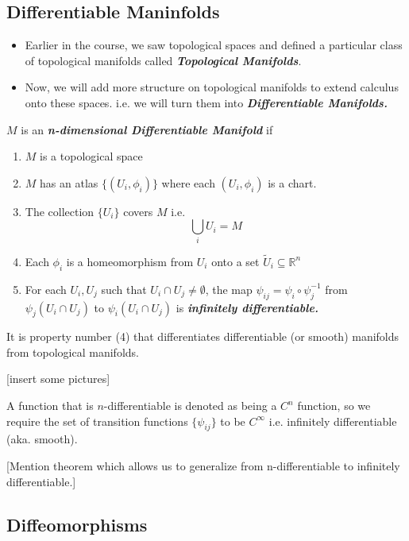 \documentclass{article}
\newcommand{\R}{\mathbb{R}}
\begin{document}
\subsection{Differentiable Maninfolds}

\begin{itemize}
  \item Earlier in the course, we saw topological spaces and defined a particular class of topological manifolds called \emph{\textbf{Topological Manifolds}}.
  \item Now, we will add more structure on topological manifolds to extend calculus onto these spaces. i.e. we will turn them into \emph{\textbf{Differentiable Manifolds.}}
\end{itemize}

\vskip 0.5cm
\begin{mathdefinitionbox}{}
  $M$ is an \emph{\textbf{n-dimensional Differentiable Manifold}} if 
  \begin{enumerate}
    \item $M$ is a topological space
    \item $M$ has an atlas $\{(U_i,\phi_i)\}$ where each $(U_i, \phi_i)$ is a chart.
    \item The collection $\{U_i\}$ covers $M$ i.e. 
    \[ \bigcup_{i} U_i = M \]
    \item Each $\phi_i$ is a homeomorphism from $U_i$ onto a set $\tilde{U}_i \subseteq \R^n$
    \item For each $U_i, U_j$ such that $U_i \cap U_j \neq \emptyset$, the map $\psi_{ij} = \psi_i \circ \psi_{j}^{-1}$ from $\psi_j(U_i \cap U_j)$ to $\psi_i(U_i \cap U_j)$ is \emph{\textbf{infinitely differentiable.}}
  \end{enumerate}
\end{mathdefinitionbox}

\vskip 0.25cm
It is property number (4) that differentiates differentiable (or smooth) manifolds from topological manifolds.

\vskip 0.25cm
[insert some pictures]

\vskip 0.25cm
A function that is $n$-differentiable is denoted as being a $C^{n}$ function, so we require the set of transition functions $\{\psi_{ij}\}$ to be $C^{\infty}$ i.e. infinitely differentiable (aka. smooth).

[Mention theorem which allows us to generalize from n-differentiable to infinitely differentiable.]

\vskip 1cm
\subsection{Diffeomorphisms}
\end{document}

